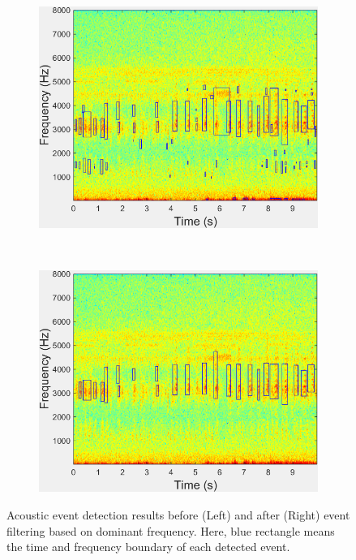 \begin{figure}[htb!]
\centering

        \begin{subfigure}[b]{0.45\textwidth}
                \includegraphics[width=\textwidth]{image/Ch6/AEoriginal.png}
        \end{subfigure}
       ~
              \begin{subfigure}[b]{0.45\textwidth}
                \includegraphics[width=\textwidth]{image/Ch6/AEfinal.png}
                
        \end{subfigure}  
     
\caption[Acoustic event detection results before (Left) and after (Right) event filtering based on dominant frequency]{Acoustic event detection results before (Left) and after (Right) event filtering based on dominant frequency. Here, blue rectangle means the time and frequency boundary of each detected event.}
        \label{fig:feature}
\end{figure}

